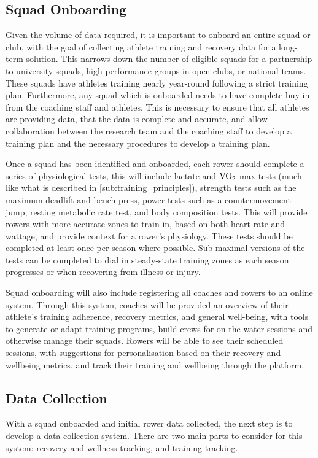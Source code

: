 \subsection{\label{sub:ideal-onboard}Squad Onboarding}
Given the volume of data required, it is important to onboard an entire squad or club, with the goal of collecting athlete training and recovery data for a long-term solution. This narrows down the number of eligible squads for a partnership to university squads, high-performance groups in open clubs, or national teams. These squads have athletes training nearly year-round following a strict training plan. Furthermore, any squad which is onboarded needs to have complete buy-in from the coaching staff and athletes. This is necessary to ensure that all athletes are providing data, that the data is complete and accurate, and allow collaboration between the research team and the coaching staff to develop a training plan and the necessary procedures to develop a training plan.

Once a squad has been identified and onboarded, each rower should complete a series of physiological tests, this will include lactate and $\textnormal{VO}_2$ max tests (much like what is described in \autoref{sub:training_principles}), strength tests such as the maximum deadlift and bench press, power tests such as a countermovement jump, resting metabolic rate test, and body composition tests. This will provide rowers with more accurate zones to train in, based on both heart rate and wattage, and provide context for a rower's physiology. These tests should be completed at least once per season where possible. Sub-maximal versions of the tests can be completed to dial in steady-state training zones as each season progresses or when recovering from illness or injury.

Squad onboarding will also include registering all coaches and rowers to an online system. Through this system, coaches will be provided an overview of their athlete's training adherence, recovery metrics, and general well-being, with tools to generate or adapt training programs, build crews for on-the-water sessions and otherwise manage their squads. Rowers will be able to see their scheduled sessions, with suggestions for personalisation based on their recovery and wellbeing metrics, and track their training and wellbeing through the platform.

\subsection{\label{sub:ideal-data-collection}Data Collection}
With a squad onboarded and initial rower data collected, the next step is to develop a data collection system. There are two main parts to consider for this system: recovery and wellness tracking, and training tracking.


